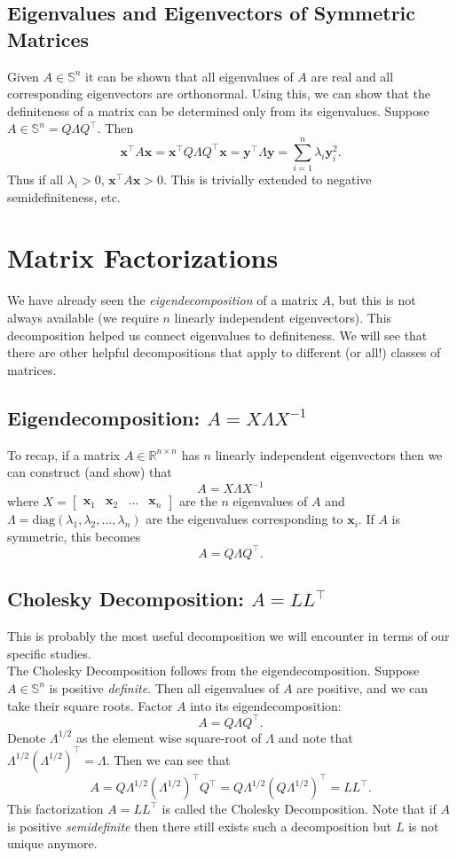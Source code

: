 \documentclass{article}
\newcommand{\1}{\mathbf{1}}
\newcommand{\0}{\mathbf{0}}
\newcommand{\xx}{\mathbf{x}}
\newcommand{\yy}{\mathbf{y}}
\newcommand{\RR}{\mathbb{R}}
\renewcommand{\SS}{\mathbb{S}}
\newcommand{\T}{\top}
\newcommand{\m}[1]{\begin{bmatrix} #1 \end{bmatrix}}
\begin{document}
\subsection{Eigenvalues and Eigenvectors of Symmetric Matrices}

Given $A\in\SS^n$ it can be shown that all eigenvalues of $A$ are
real and all corresponding eigenvectors are orthonormal. Using this,
we can show that the definiteness of a matrix can be determined only
from its eigenvalues. Suppose $A\in\SS^n = Q\Lambda Q^\T$. Then
\[
    \xx^\T A\xx = \xx^\T Q\Lambda Q^\T\xx = \yy^\T\Lambda\yy = \sum_{i=1}^n \lambda_i\yy_i^2.
\]
Thus if all $\lambda_i > 0$, $\xx^\T A\xx > 0$. This is trivially extended
to negative semidefiniteness, etc.

\section{Matrix Factorizations}

We have already seen the \textit{eigendecomposition} of a matrix $A$,
but this is not always available (we require $n$ linearly independent
eigenvectors). This decomposition helped us connect eigenvalues to
definiteness. We will see that there are other helpful decompositions
that apply to different (or all!) classes of matrices.

\subsection{Eigendecomposition: $A = X\Lambda X^{-1}$}

To recap, if a matrix $A\in\RR^{n\times n}$ has $n$ linearly independent
eigenvectors then we can construct (and show) that
\[
    A = X \Lambda X^{-1}
\]
where $X = \m{\xx_1 & \xx_2 & \dots & \xx_n}$ are the $n$ eigenvalues of
$A$ and $\Lambda = \mathrm{diag}(\lambda_1, \lambda_2,\dots, \lambda_n)$
are the eigenvalues corresponding to $\xx_i$. If $A$ is symmetric, this becomes
\[
    A = Q\Lambda Q^\T.
\]

\subsection{Cholesky Decomposition: $A = LL^\T$}

This is probably the most useful decomposition we will encounter
in terms of our specific studies.\\

The Cholesky Decomposition follows from the eigendecomposition.
Suppose $A\in\SS^n$ is positive \textit{definite}. Then all eigenvalues
of $A$ are positive, and we can take their square roots. Factor
$A$ into its eigendecomposition:
\[
    A = Q\Lambda Q^\T.
\]
Denote $\Lambda^{1/2}$ as the element wise square-root of $\Lambda$
and note that $\Lambda^{1/2}\left(\Lambda^{1/2}\right)^\T = \Lambda$.
Then we can see that
\[
    A = Q\Lambda^{1/2} (\Lambda^{1/2})^\T Q^\T = Q\Lambda^{1/2}\left(Q\Lambda^{1/2}\right)^\T = LL^\T.
\]
This factorization $A=LL^\T$ is called the Cholesky Decomposition. Note
that if $A$ is positive \textit{semidefinite} then there still exists such
a decomposition but $L$ is not unique anymore.\\
\end{document}
